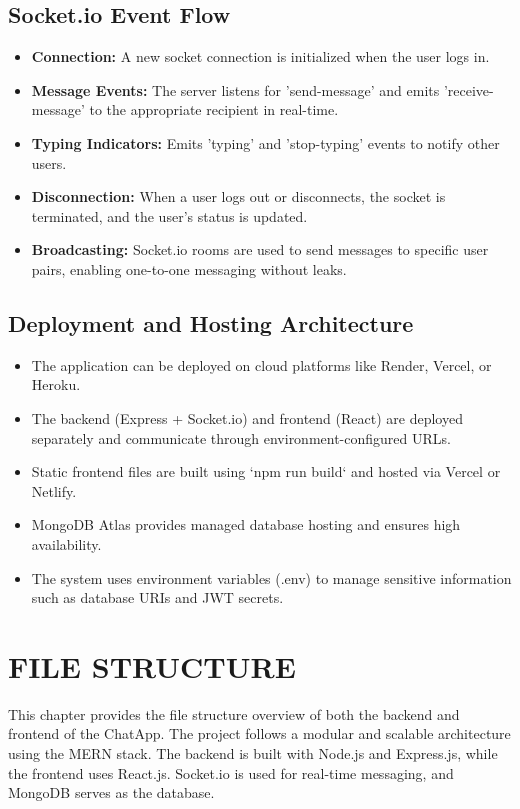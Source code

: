 \documentclass[12pt,a4paper]{report}
\begin{document}
\section{Socket.io Event Flow}
\begin{itemize}
    \item \textbf{Connection:} A new socket connection is initialized when the user logs in.
    \item \textbf{Message Events:} The server listens for 'send-message' and emits 'receive-message' to the appropriate recipient in real-time.
    \item \textbf{Typing Indicators:} Emits 'typing' and 'stop-typing' events to notify other users.
    \item \textbf{Disconnection:} When a user logs out or disconnects, the socket is terminated, and the user's status is updated.
    \item \textbf{Broadcasting:} Socket.io rooms are used to send messages to specific user pairs, enabling one-to-one messaging without leaks.
\end{itemize}

\section{Deployment and Hosting Architecture}
\begin{itemize}
    \item The application can be deployed on cloud platforms like Render, Vercel, or Heroku.
    \item The backend (Express + Socket.io) and frontend (React) are deployed separately and communicate through environment-configured URLs.
    \item Static frontend files are built using `npm run build` and hosted via Vercel or Netlify.
    \item MongoDB Atlas provides managed database hosting and ensures high availability.
    \item The system uses environment variables (.env) to manage sensitive information such as database URIs and JWT secrets.
\end{itemize}

\newpage


\chapter{ FILE STRUCTURE}

This chapter provides the file structure overview of both the backend and frontend of the ChatApp. The project follows a modular and scalable architecture using the MERN stack. The backend is built with Node.js and Express.js, while the frontend uses React.js. Socket.io is used for real-time messaging, and MongoDB serves as the database.
\end{document}
